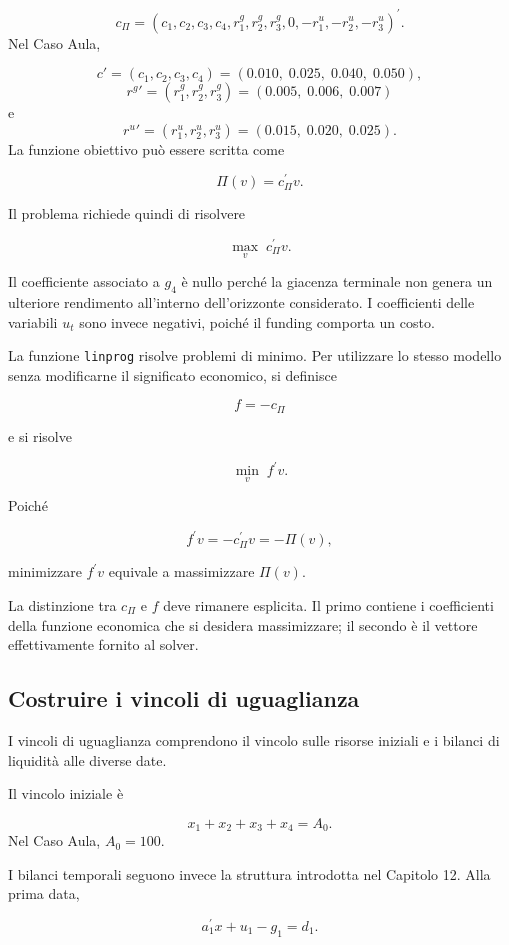 \[
c_{\Pi}
=
\left(
c_1,c_2,c_3,c_4,
r_1^g,r_2^g,r_3^g,0,
-r_1^u,-r_2^u,-r_3^u
\right)^{\prime}.
\]
Nel Caso Aula, 

\[
c'=(c_1,c_2,c_3,c_4)=(0.010,\;0.025,\;0.040,\;0.050),
\]
\[
{r^g}'=(r_1^g,r_2^g,r_3^g)=(0.005,\;0.006,\;0.007)
\]
e
\[
{r^u}'=(r_1^u,r_2^u,r_3^u)=(0.015,\;0.020,\;0.025).
\]
La funzione obiettivo pu\`o essere scritta come

\[
\Pi(v)
=
c_{\Pi}^{\prime}v.
\]

\noindent Il problema richiede quindi di risolvere

\[
\max_{v}\; c_{\Pi}^{\prime}v.
\]

Il coefficiente associato a $g_4$ \`e nullo perch\'e la giacenza terminale non
genera un ulteriore rendimento all'interno dell'orizzonte considerato. I
coefficienti delle variabili $u_t$ sono invece negativi, poich\'e il funding
comporta un costo.

La funzione \texttt{linprog} risolve problemi di minimo. Per utilizzare lo
stesso modello senza modificarne il significato economico, si definisce

\[
f=-c_{\Pi}
\]

\noindent e si risolve

\[
\min_{v}\; f^{\prime}v.
\]

Poich\'e

\[
f^{\prime}v
=
-c_{\Pi}^{\prime}v
=
-\Pi(v),
\]

\noindent minimizzare $f^{\prime}v$ equivale a massimizzare $\Pi(v)$.

La distinzione tra $c_{\Pi}$ e $f$ deve rimanere esplicita. Il primo contiene
i coefficienti della funzione economica che si desidera massimizzare; il
secondo \`e il vettore effettivamente fornito al solver.

\subsection{Costruire i vincoli di uguaglianza}

I vincoli di uguaglianza comprendono il vincolo sulle risorse iniziali e i
bilanci di liquidit\`a alle diverse date.

Il vincolo iniziale \`e

\[
x_1+x_2+x_3+x_4=A_0.
\]
Nel Caso Aula, $A_0=100$.

I bilanci temporali seguono invece la struttura introdotta nel Capitolo 12.
Alla prima data,

\[
a_1^{\prime}x+u_1-g_1=d_1.
\]

